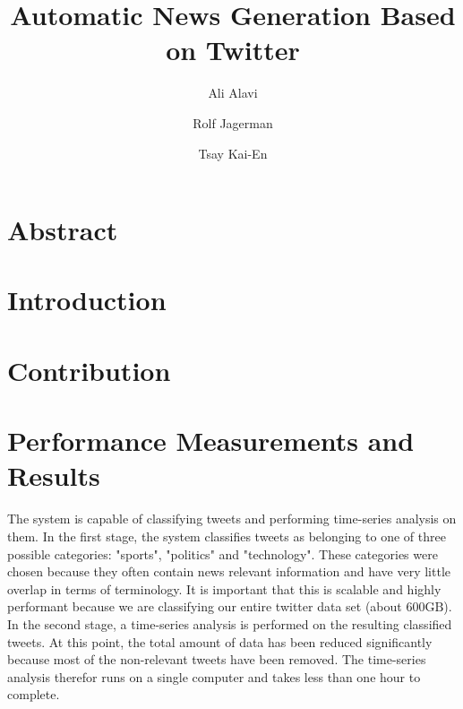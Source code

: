 \documentclass{llncs}
\begin{document}
%
\mainmatter              %
\pagestyle{headings}

%
\title{Automatic News Generation Based on Twitter}
%
%
\author{Ali Alavi \and Rolf Jagerman \and
Tsay Kai-En}
%
%
%

\maketitle              %
%

\section{Abstract}

\section{Introduction}

\section{Contribution}


\section{Performance Measurements and Results}
The system is capable of classifying tweets and performing time-series analysis on them. In the first stage, the system classifies tweets as belonging to one of three possible categories: "sports", "politics" and "technology". These categories were chosen because they often contain news relevant information and have very little overlap in terms of terminology. It is important that this is scalable and highly performant because we are classifying our entire twitter data set (about $600\text{GB}$). In the second stage, a time-series analysis is performed on the resulting classified tweets. At this point, the total amount of data has been reduced significantly because most of the non-relevant tweets have been removed. The time-series analysis therefor runs on a single computer and takes less than one hour to complete.
\end{document}
